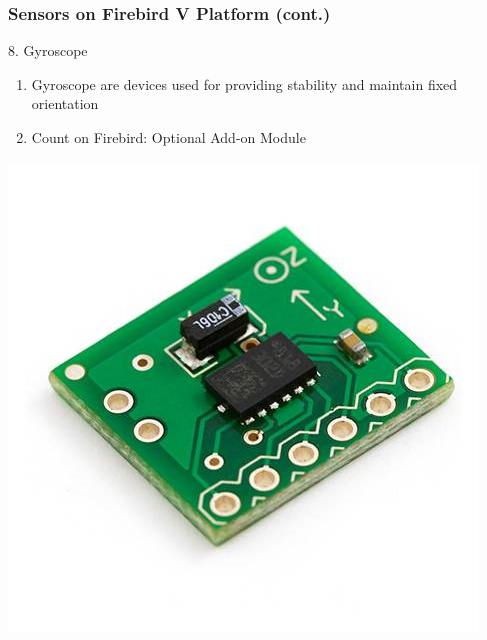 \documentclass[10pt,red]{beamer}
\begin{document}
\begin{frame}
	\frametitle{Sensors on Firebird V Platform (cont.)} 
	8. Gyroscope	\pause
		\vfill
		\begin{minipage}[c]{0.5\textwidth}
			\begin{enumerate}
				\item <+-|alert@+> Gyroscope are devices used for providing stability and maintain fixed orientation \\[10pt]
				\item <+-|alert@+> Count on Firebird: Optional Add-on Module
			\end{enumerate}
		\end{minipage}
		\hfill
		\begin{minipage}[c]{0.4\textwidth}
			\includegraphics[width=\linewidth]{gyroscope}
		\end{minipage}	
\end{frame}	
\end{document}
